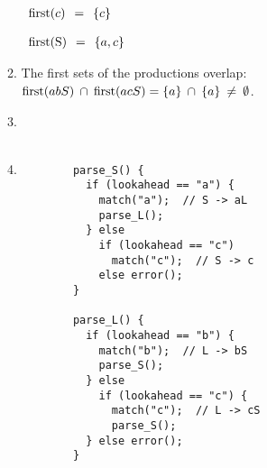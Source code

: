 \documentclass[11pt]{article}
\begin{document}
\begin{enumerate}
\begin{multicols}{2}
\begin{enumerate}
                  \smallskip

                  \(
                    \begin{array}{lcl}
                      \mathrm{first}(c)
                        & \hspace{-1mm}=\hspace{-1mm}
                        & \{c\}
                        \\
                    \end{array}
                  \)

                  \smallskip

                  \(
                    \begin{array}{lcl}
                      \mathrm{first}(\mathrm{S})
                        & \hspace{-1mm}=\hspace{-1mm}
                        & \{a, c\}
                        \\
                    \end{array}
                  \)

            \item The first sets of the productions overlap:
                  $\mathrm{first}(abS) \: \cap \: \mathrm{first}(acS) =
                  \{a\} \: \cap \: \{a\} \: \ne \: \emptyset$.

            \item \begin{grammar}

                      \\

                      \\

                  \end{grammar}

            \item \begin{Verbatim}
        parse_S() {
          if (lookahead == "a") {
            match("a");  // S -> aL
            parse_L();
          } else
            if (lookahead == "c")
              match("c");  // S -> c
            else error();
        }

        parse_L() {
          if (lookahead == "b") {
            match("b");  // L -> bS
            parse_S();
          } else
            if (lookahead == "c") {
              match("c");  // L -> cS
              parse_S();
          } else error();
        }
                  \end{Verbatim}

          \end{enumerate}

          \end{multicols}

  \end{enumerate}
\end{document}
